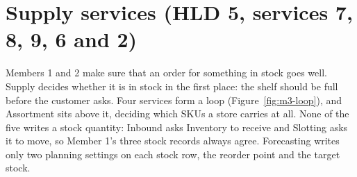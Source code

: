 %

\section{Supply services (HLD 5, services 7, 8, 9, 6 and 2)}
\label{sec:m3-services}

Members 1 and 2 make sure that an order for something in stock goes well. Supply decides whether it is in stock in
the first place: the shelf should be full before the customer asks. Four services form a loop
(Figure~\ref{fig:m3-loop}), and Assortment sits above it, deciding which SKUs a store carries at all. None of the five
writes a stock quantity: Inbound asks Inventory to receive and Slotting asks it to move, so Member 1's three stock
records always agree. Forecasting writes only two planning settings on each stock row, the reorder point and the
target stock.

